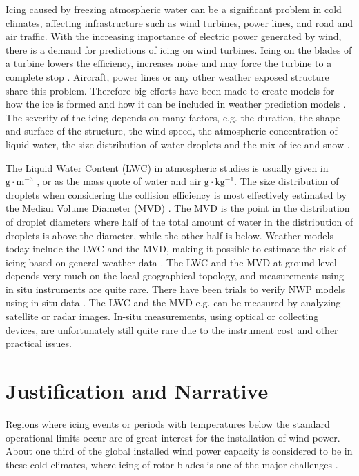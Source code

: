 Icing caused by freezing atmospheric water can be a significant problem in cold climates, affecting infrastructure such as wind turbines, power lines, and road and air traffic. With the increasing importance of electric power generated by wind, there is a demand for predictions of icing on wind turbines. Icing on the blades of a turbine lowers the efficiency, increases noise and may force the turbine to a complete stop \cite{dalili2009,cost727,homo2012,jasin1998}. Aircraft, power lines or any other weather exposed structure share this problem. Therefore big efforts have been made to create models for how the ice is formed \cite{makk2000,makk2001,shin1992} and how it can be included in weather prediction models \cite{thomp2009,kring2011}. The severity of the icing depends on many factors, e.g. the duration, the shape and surface of the structure, the wind speed, the atmospheric concentration of liquid water, the size distribution of water droplets and the mix of ice and snow \cite{kring2011,makk2000,makk2001,homo2010,han2012}. 

The Liquid Water Content (LWC) in atmospheric studies is usually given in $\mathrm{g\cdot m^{-3}}$ \cite{sein1998}, or as the mass quote of water and air $\mathrm{g\cdot kg^{-1}}$. The size distribution of droplets when considering the collision efficiency is most effectively estimated by the Median Volume Diameter (MVD) \cite{fins1988}. The MVD is the point in the distribution of droplet diameters where half of the total amount of water in the distribution of droplets is above the diameter, while the other half is below. Weather models today include the LWC and the MVD, making it possible to estimate the risk of icing based on general weather data \cite{thomp2009}. The LWC and the MVD at ground level depends very much on the local geographical topology, and measurements using in situ instruments are quite rare. There have been trials to verify NWP models using in-situ data \cite{berg2013}. The LWC and the MVD e.g. can be measured by analyzing satellite or radar images. In-situ measurements, using optical or collecting devices, are unfortunately still quite rare due to the instrument cost and other practical issues.

\section{Justification and Narrative}

Regions where icing events or periods with temperatures below the standard operational limits occur are of great interest for the installation of wind power. About one third of the global installed wind power capacity is considered to be in these cold climates, where icing of rotor blades is one of the major challenges \cite{iea2017}.

